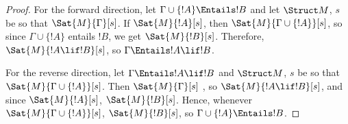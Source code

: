 \documentclass[../../../include/open-logic-section]{subfiles}
\begin{document}
\begin{proof}
For the forward direction, let $\Gamma \cup \{ !A \} \Entails !B$ and let $
\Struct M$, $s$ be so that $\Sat{M}{\Gamma}[s]$. If $\Sat{M}{!A}[s]$, then $
\Sat{M}{\Gamma \cup \{ !A \}}[s]$, so since $\Gamma \cup \{ !A \}$ entails $!B
$, we get $\Sat{M}{!B}[s]$. Therefore, $\Sat{M}{!A \lif !B}[s]$, so $\Gamma 
\Entails !A \lif !B$.

For the reverse direction, let $\Gamma \Entails !A \lif !B$ and $\Struct M$, $
s$ be so that $\Sat{M}{\Gamma \cup \{ !A   \}}[s]$. Then $\Sat{M}{\Gamma}[s]$
, so $\Sat{M}{!A \lif !B}[s]$, and since $\Sat{M}{!A}[s]$, $\Sat{M}{!B}[s]$. 
Hence, whenever $\Sat{M}{\Gamma \cup \{   !A \} }[s]$, $\Sat{M}{!B}[s]$, so $
\Gamma \cup \{ !A \} \Entails !B$.
\end{proof}
\end{document}
